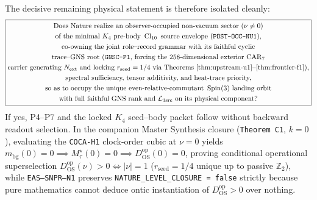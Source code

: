 \documentclass[11pt,a4paper]{article}
\theoremstyle{remark}
\begin{document}
The decisive remaining physical statement is therefore isolated cleanly:
\begin{equation}
 \boxed{\begin{gathered}
 \text{Does Nature realize an observer-occupied non-vacuum sector }(\nu\neq 0)\\
 \text{of the minimal }K_4\text{ pre-body }\operatorname{Cl}_{10}\text{ source envelope (\texttt{POST-OCC-NU1}),}\\
 \text{co-owning the joint role--record grammar with its faithful cyclic}\\
 \text{trace--GNS root (\texttt{GNSC--P1}, forcing the }256\text{-dimensional exterior }\mathrm{CAR}_7\\
 \text{carrier generating }N_{\rm ext}\text{ and locking }r_{\mathrm{seed}}=1/4\text{ via Theorems~\ref{thm:upstream-u1}--\ref{thm:frontier-f1}),}\\
 \text{spectral sufficiency, tensor additivity, and heat-trace priority,}\\
 \text{so as to occupy the unique even-relative-commutant }\operatorname{Spin}(3)\text{ landing orbit}\\
 \text{with full faithful GNS rank and }\mathcal L_{\rm 1src}\text{ on its physical component?}
 \end{gathered}}
 \label{eq:nature}
\end{equation}
If yes, P4--P7 and the locked $K_4$ seed--body packet follow without backward
readout selection.  In the companion Master Synthesis closure (\texttt{Theorem~C1},
$k=0$), evaluating the \texttt{COCA-H1} clock-order cubic at $\nu=0$ yields
$m_{\mathrm{bg}}(0)=0\implies M_\tau^\star(0)=0\implies D_{\mathrm{OS}}^{\mathrm{op}}(0)=0$,
proving conditional operational superselection
$D_{\mathrm{OS}}^{\mathrm{op}}(\nu)>0\iff|\nu|=1$ ($r_{\mathrm{seed}}=1/4$ unique
up to passive $\mathbb{Z}_2$), while \texttt{EAS--SNPR--N1} preserves
\texttt{NATURE\_LEVEL\_CLOSURE = false} strictly because pure mathematics cannot
deduce ontic instantiation of $D_{\mathrm{OS}}^{\mathrm{op}}>0$ over nothing.



\end{document}
